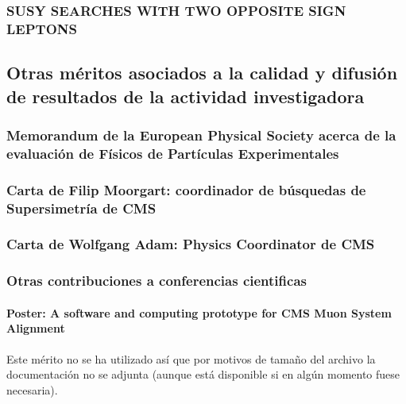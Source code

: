 \documentclass[a4paper, 11pt, twoside, openright]{report}
\begin{document}
\subsubsection{SUSY SEARCHES WITH TWO OPPOSITE SIGN LEPTONS}



\subsection{Otras méritos asociados a la calidad y difusión de resultados de la actividad investigadora}

\subsubsection{Memorandum de la European Physical Society acerca de la evaluación de Físicos de Partículas Experimentales}


\subsubsection{Carta de Filip Moorgart: coordinador de búsquedas de Supersimetría de CMS}


\subsubsection{Carta de Wolfgang Adam: Physics Coordinator de CMS}



\subsubsection{Otras contribuciones a conferencias cientificas}


\paragraph{Poster: A software and computing prototype for CMS Muon System Alignment}
%
Este mérito no se ha utilizado así que por motivos de tamaño del archivo la documentación no se adjunta (aunque está disponible si en algún momento fuese necesaria).
\end{document}
